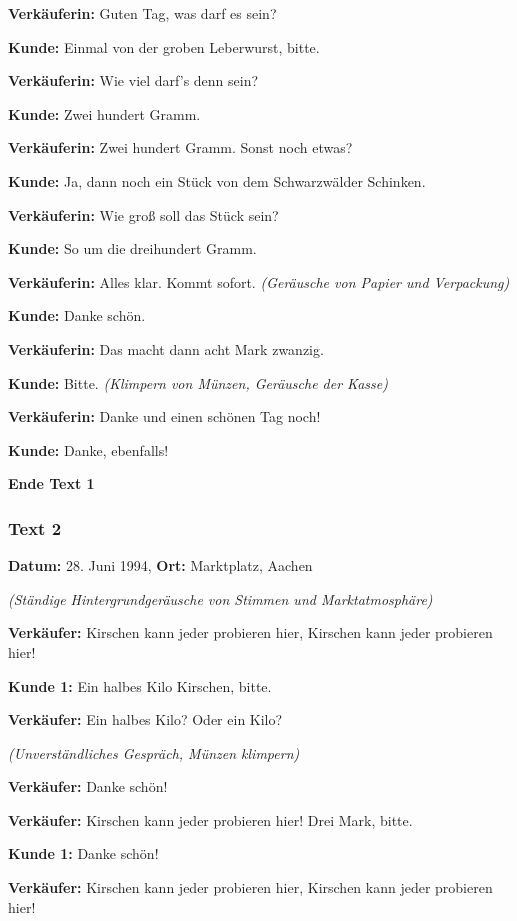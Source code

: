\documentclass[
]{article}
\begin{document}
\textbf{Verkäuferin:} Guten Tag, was darf es sein?

\textbf{Kunde:} Einmal von der groben Leberwurst, bitte.

\textbf{Verkäuferin:} Wie viel darf's denn sein?

\textbf{Kunde:} Zwei hundert Gramm.

\textbf{Verkäuferin:} Zwei hundert Gramm. Sonst noch etwas?

\textbf{Kunde:} Ja, dann noch ein Stück von dem Schwarzwälder Schinken.

\textbf{Verkäuferin:} Wie groß soll das Stück sein?

\textbf{Kunde:} So um die dreihundert Gramm.

\textbf{Verkäuferin:} Alles klar. Kommt sofort. \emph{(Geräusche von
Papier und Verpackung)}

\textbf{Kunde:} Danke schön.

\textbf{Verkäuferin:} Das macht dann acht Mark zwanzig.

\textbf{Kunde:} Bitte. \emph{(Klimpern von Münzen, Geräusche der Kasse)}

\textbf{Verkäuferin:} Danke und einen schönen Tag noch!

\textbf{Kunde:} Danke, ebenfalls!

\textbf{Ende Text 1}

\subsubsection{\texorpdfstring{\textbf{Text 2}}{Text 2}}\label{text-2}

\textbf{Datum:} 28. Juni 1994, \textbf{Ort:} Marktplatz, Aachen

\emph{(Ständige Hintergrundgeräusche von Stimmen und Marktatmosphäre)}

\textbf{Verkäufer:} Kirschen kann jeder probieren hier, Kirschen kann
jeder probieren hier!

\textbf{Kunde 1:} Ein halbes Kilo Kirschen, bitte.

\textbf{Verkäufer:} Ein halbes Kilo? Oder ein Kilo?

\emph{(Unverständliches Gespräch, Münzen klimpern)}

\textbf{Verkäufer:} Danke schön!

\textbf{Verkäufer:} Kirschen kann jeder probieren hier! Drei Mark,
bitte.

\textbf{Kunde 1:} Danke schön!

\textbf{Verkäufer:} Kirschen kann jeder probieren hier, Kirschen kann
jeder probieren hier!
\end{document}
